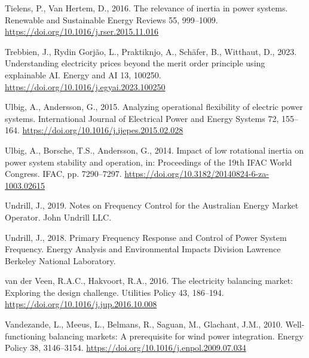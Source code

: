 \documentclass[12pt,a4paper,]{report}
\newlength{\cslhangindent}
\newenvironment{CSLReferences}[2] %
 {%
  \setlength{\parindent}{0pt}
  \ifodd #1 \everypar{\setlength{\hangindent}{\cslhangindent}}\ignorespaces\fi
  \ifnum #2 > 0
  \setlength{\parskip}{#2\baselineskip}
  \fi
 }%
 {}
\begin{document}
\begin{CSLReferences}{1}{0}
\leavevmode{}%
Tielens, P., Van Hertem, D., 2016. The relevance of inertia in power
systems. Renewable and Sustainable Energy Reviews 55, 999--1009.
\url{https://doi.org/10.1016/j.rser.2015.11.016}

\leavevmode{}%
Trebbien, J., Rydin Gorjão, L., Praktiknjo, A., Schäfer, B., Witthaut,
D., 2023. Understanding electricity prices beyond the merit order
principle using explainable {AI}. Energy and AI 13, 100250.
\url{https://doi.org/10.1016/j.egyai.2023.100250}

\leavevmode{}%
Ulbig, A., Andersson, G., 2015. Analyzing operational flexibility of
electric power systems. International Journal of Electrical Power and
Energy Systems 72, 155--164.
\url{https://doi.org/10.1016/j.ijepes.2015.02.028}

\leavevmode{}%
Ulbig, A., Borsche, T.S., Andersson, G., 2014. Impact of low rotational
inertia on power system stability and operation, in: Proceedings of the
19th {IFAC World Congress}. {IFAC}, pp. 7290--7297.
\url{https://doi.org/10.3182/20140824-6-za-1003.02615}

\leavevmode{}%
Undrill, J., 2019. Notes on {Frequency Control} for the {Australian
Energy Market Operator}. {John Undrill LLC}.

\leavevmode{}%
Undrill, J., 2018. Primary {Frequency Response} and {Control} of {Power
System Frequency}. Energy Analysis and Environmental Impacts Division
Lawrence Berkeley National Laboratory.

\leavevmode{}%
van der Veen, R.A.C., Hakvoort, R.A., 2016. The electricity balancing
market: {Exploring} the design challenge. Utilities Policy 43, 186--194.
\url{https://doi.org/10.1016/j.jup.2016.10.008}

\leavevmode{}%
Vandezande, L., Meeus, L., Belmans, R., Saguan, M., Glachant, J.M.,
2010. Well-functioning balancing markets: {A} prerequisite for wind
power integration. Energy Policy 38, 3146--3154.
\url{https://doi.org/10.1016/j.enpol.2009.07.034}


\end{CSLReferences}
\end{document}
